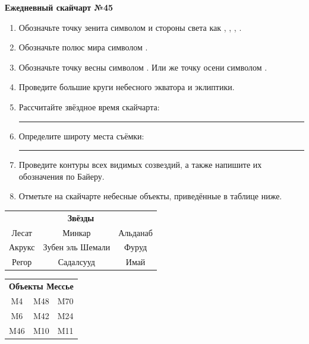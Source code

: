 \documentclass{./SAS-class-skygen}
\begin{document}
    
    
    
	\begin{center}
		\large\textbf{Ежедневный скайчарт №45}
	\end{center}

	\begin{enumerate}
		\item Обозначьте точку зенита символом  и стороны света как , , , .
		\item Обозначьте полюс мира символом .
		\item Обозначьте точку весны символом \Aries. Или же точку осени символом \Libra.
		\item Проведите большие круги небесного экватора и эклиптики.
		\item Рассчитайте звёздное время скайчарта: \rule{2cm}{0.4pt}
		\item Определите широту места съёмки: \rule{2cm}{0.4pt}
		\item Проведите контуры всех видимых созвездий, а также напишите их обозначения по Байеру.
		\item Отметьте на скайчарте небесные объекты, приведённые в таблице ниже.
	\end{enumerate}
	
    \vspace{0.5cm}

    \begin{table}[h!]
    \centering
    \begin{tabular}{ccc}
    \multicolumn{3}{c}{\textbf{Звёзды}} \\ Лесат & Минкар & Альданаб \\
Акрукс & Зубен эль Шемали & Фуруд \\
Регор & Садалсууд & Имай \\

\end{tabular}
    \hfill
    \begin{tabular}{ccc}
    \multicolumn{3}{c}{\textbf{Объекты Мессье}} \\ M4 & M48 & M70 \\
M6 & M42 & M24 \\
M46 & M10 & M11 \\

\end{tabular}
    \end{table}
	
\end{document}
